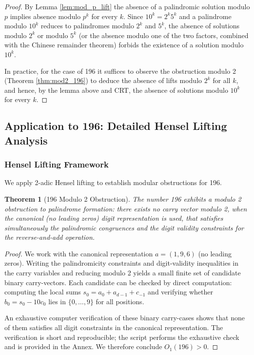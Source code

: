 \documentclass[11pt,a4paper]{article}
\theoremstyle{plain}
\newtheorem{theorem}{Theorem}[section]
\theoremstyle{definition}
\begin{document}
\begin{proof}
By Lemma \ref{lem:mod_p_lift} the absence of a palindromic solution modulo $p$ implies absence modulo $p^k$ for every $k$. Since $10^k=2^k5^k$ and a palindrome modulo $10^k$ reduces to palindromes modulo $2^k$ and $5^k$, the absence of solutions modulo $2^k$ or modulo $5^k$ (or the absence modulo one of the two factors, combined with the Chinese remainder theorem) forbids the existence of a solution modulo $10^k$.

In practice, for the case of 196 it suffices to observe the obstruction modulo 2 (Theorem \ref{thm:mod2_196}) to deduce the absence of lifts modulo $2^k$ for all $k$, and hence, by the lemma above and CRT, the absence of solutions modulo $10^k$ for every $k$.
\end{proof}

\subsection{Application to 196: Detailed Hensel Lifting Analysis}

\subsubsection{Hensel Lifting Framework}

We apply 2-adic Hensel lifting to establish modular obstructions for 196.

\begin{theorem}[196 Modulo 2 Obstruction]\label{thm:196_mod2}
The number 196 exhibits a modulo 2 obstruction to palindrome formation: there exists no carry vector modulo 2, when the canonical (no leading zeros) digit representation is used, that satisfies simultaneously the palindromic congruences and the digit validity constraints for the reverse-and-add operation.
\end{theorem}

\begin{proof}
We work with the canonical representation $a=(1,9,6)$ (no leading zeros). Writing the palindromicity constraints and digit-validity inequalities in the carry variables and reducing modulo 2 yields a small finite set of candidate binary carry-vectors. Each candidate can be checked by direct computation: computing the local sums $s_0=a_0+a_{d-1}+c_{-1}$ and verifying whether $b_0=s_0-10c_0$ lies in $\{0,\ldots,9\}$ for all positions.

An exhaustive computer verification of these binary carry-cases shows that none of them satisfies all digit constraints in the canonical representation. The verification is short and reproducible; the script \texttt{} performs the exhaustive check and is provided in the Annex. We therefore conclude $O_1(196)>0$.
\end{proof}
\end{document}
